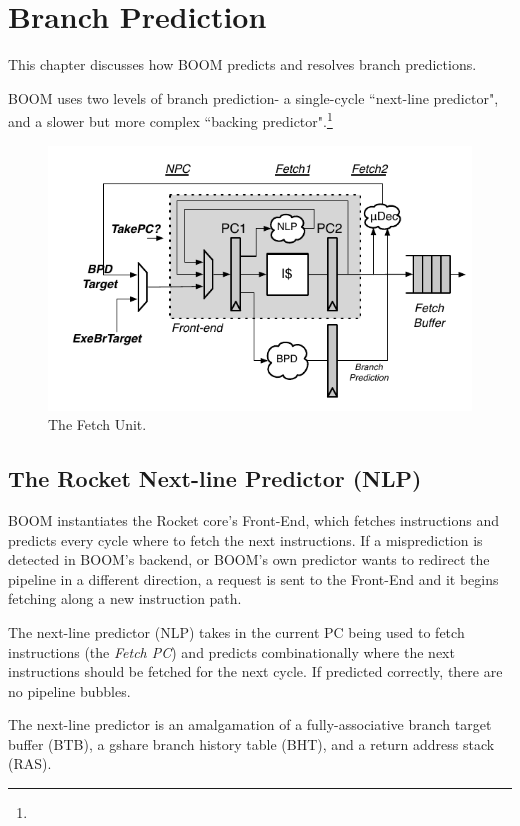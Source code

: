  
\chapter{Branch Prediction}

This chapter discusses how BOOM predicts and resolves branch predictions.

BOOM uses two levels of branch prediction- a single-cycle ``next-line predictor", and a slower but more complex ``backing predictor".\footnote{}


\begin{figure}[ht]
	\centering
	\centerline{\includegraphics[scale =1] {figures/frontend}}
	\caption{ \small The Fetch Unit.}
	\label{fig:lsu}
\end{figure}


\section{The Rocket Next-line Predictor (NLP)}

BOOM instantiates the Rocket core's Front-End, which fetches instructions and predicts every cycle where to fetch the next instructions. If a misprediction is detected in BOOM's backend, or BOOM's own predictor wants to redirect the pipeline in a different direction, a request is sent to the Front-End and it begins fetching along a new instruction path. 

The next-line predictor (NLP) takes in the current PC being used to fetch instructions (the {\em Fetch PC}) and predicts combinationally where the next instructions should be fetched for the next cycle. If predicted correctly, there are no pipeline bubbles. 

The next-line predictor is an amalgamation of a fully-associative branch target buffer (BTB), a gshare branch history table (BHT), and a return address stack (RAS).  

